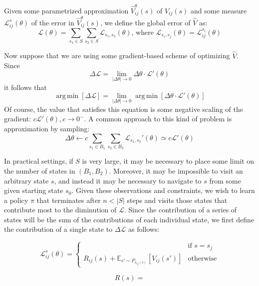 \documentclass{article}
\DeclareMathOperator*{\argmin}{arg\,min}
\begin{document}
Given some parametrized approximation $\hat{V}_{ij}^{\theta}(s)$ of $V_{ij}(s)$ and some measure $\mathcal{L}_{ij}^s(\theta)$ of the error in $\hat{V}_{ij}^{\theta}(s)$, we define the global error of $\hat{V}$ as:
\[
   \mathcal{L}(\theta) = \sum_{s_1 \in S}\sum_{s_2 \in S}\mathcal{L}_{s_1,s_2}(\theta)
\text{, where }
   \mathcal{L}_{s_i, s_j}(\theta) = \mathcal{L}_{ij}^{s_i}(\theta)
\]


Now suppose that we are using some gradient-based scheme of optimizing $\hat{V}$. Since 
\[
  \Delta \mathcal{L} = \lim_{|\Delta \theta| \to 0}\Delta \theta \cdot \mathcal{L}'(\theta)
\]
it follows that
\[
  \argmin \left[ \Delta \mathcal{L} \right] = \lim_{|\Delta \theta| \to 0}\argmin \left[ \Delta \theta \cdot \mathcal{L}'(\theta) \right]
\]
Of course, the value that satisfies this equation is some negative scaling of the gradient: $c\mathcal{L}'(\theta), c \to 0^-$. A common approach to this kind of problem is approximation by sampling:
\[
  \Delta \theta \leftarrow c\sum_{s_1 \in B_1}\sum_{s_2 \in B_2}\mathcal{L}_{s_1,s_2}'(\theta) \simeq c\mathcal{L}'(\theta)
\]

In practical settings, if $S$ is very large, it may be necessary to place some limit on the number of states in $(B_1, B_2)$. Moreover, it may be impossible to visit an arbitrary state $s$, and instead it may be necessary to navigate to $s$ from some given starting state $s_0$. Given these observations and constraints, we wish to learn a policy $\pi$ that terminates after $n < |S|$ steps and visits those states that contribute most to the diminution of $\mathcal{L}$. Since the contribution of a series of states will be the sum of the contributions of each individual state, we first define the contribution of a single state to $\Delta \mathcal{L}$ as follows:

\[
	\mathcal{L}_{ij}^s(\theta) = 
  \begin{cases}
     & \text{if } s = s_j \\ 
    R_{ij}(s) + \mathbb{E}_{s' \sim P_{\pi_{ij}(s)}}\left [ V_{ij}(s') \right ] & \text{otherwise}
  \end{cases}
\]

\[
	R(s) = 
\]
\end{document}
